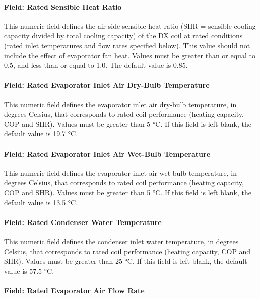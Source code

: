 \paragraph{Field: Rated Sensible Heat Ratio}\label{field-rated-sensible-heat-ratio-2}

This numeric field defines the air-side sensible heat ratio (SHR = sensible cooling capacity divided by total cooling capacity) of the DX coil at rated conditions (rated inlet temperatures and flow rates specified below). This value should not include the effect of evaporator fan heat. Values must be greater than or equal to 0.5, and less than or equal to 1.0. The default value is 0.85.

\paragraph{Field: Rated Evaporator Inlet Air Dry-Bulb Temperature}\label{field-rated-evaporator-inlet-air-dry-bulb-temperature-1}

This numeric field defines the evaporator inlet air dry-bulb temperature, in degrees Celsius, that corresponds to rated coil performance (heating capacity, COP and SHR). Values must be greater than 5 °C. If this field is left blank, the default value is 19.7 °C.

\paragraph{Field: Rated Evaporator Inlet Air Wet-Bulb Temperature}\label{field-rated-evaporator-inlet-air-wet-bulb-temperature-1}

This numeric field defines the evaporator inlet air wet-bulb temperature, in degrees Celsius, that corresponds to rated coil performance (heating capacity, COP and SHR). Values must be greater than 5 °C. If this field is left blank, the default value is 13.5 °C.

\paragraph{Field: Rated Condenser Water Temperature}\label{field-rated-condenser-water-temperature}

This numeric field defines the condenser inlet water temperature, in degrees Celsius, that corresponds to rated coil performance (heating capacity, COP and SHR). Values must be greater than 25 °C. If this field is left blank, the default value is 57.5 °C.

\paragraph{Field: Rated Evaporator Air Flow Rate}\label{field-rated-evaporator-air-flow-rate-1}

